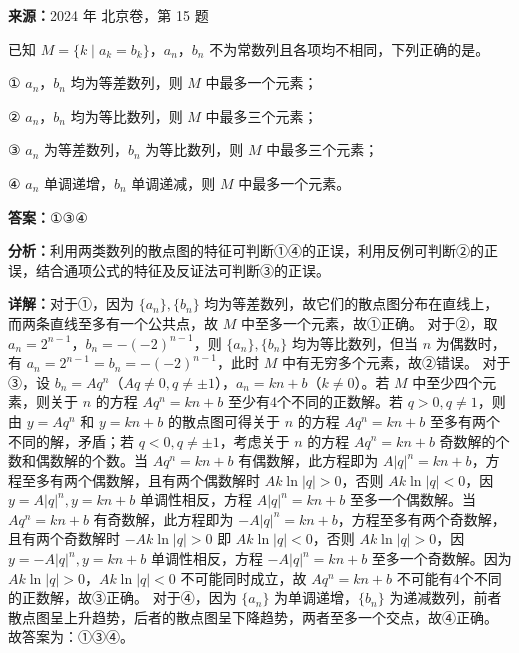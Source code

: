 \begin{question}[points=5]
\textbf{来源：}2024 年 北京卷，第 15 题\par
已知 $M = \{k \mid a_k = b_k\}$，$a_n$，$b_n$ 不为常数列且各项均不相同，下列正确的是。

① $a_n$，$b_n$ 均为等差数列，则 $M$ 中最多一个元素；

② $a_n$，$b_n$ 均为等比数列，则 $M$ 中最多三个元素；

③ $a_n$ 为等差数列，$b_n$ 为等比数列，则 $M$ 中最多三个元素；

④ $a_n$ 单调递增，$b_n$ 单调递减，则 $M$ 中最多一个元素。
\fillin[{$①③④$}]
\begin{solution}
\textbf{答案：}$①③④$

\textbf{分析：}利用两类数列的散点图的特征可判断①④的正误，利用反例可判断②的正误，结合通项公式的特征及反证法可判断③的正误。

\textbf{详解：}对于①，因为 $\{a_n\}, \{b_n\}$ 均为等差数列，故它们的散点图分布在直线上，而两条直线至多有一个公共点，故 $M$ 中至多一个元素，故①正确。
对于②，取 $a_n = 2^{n-1}$，$b_n = -(-2)^{n-1}$，则 $\{a_n\}, \{b_n\}$ 均为等比数列，但当 $n$ 为偶数时，有 $a_n = 2^{n-1} = b_n = -(-2)^{n-1}$，此时 $M$ 中有无穷多个元素，故②错误。
对于③，设 $b_n = Aq^n$（$Aq \neq 0, q \neq \pm 1$），$a_n = kn + b$（$k \neq 0$）。若 $M$ 中至少四个元素，则关于 $n$ 的方程 $Aq^n = kn + b$ 至少有4个不同的正数解。若 $q>0, q\neq 1$，则由 $y=Aq^n$ 和 $y=kn+b$ 的散点图可得关于 $n$ 的方程 $Aq^n = kn+b$ 至多有两个不同的解，矛盾；若 $q<0, q\neq \pm 1$，考虑关于 $n$ 的方程 $Aq^n = kn+b$ 奇数解的个数和偶数解的个数。当 $Aq^n = kn+b$ 有偶数解，此方程即为 $A|q|^n = kn+b$，方程至多有两个偶数解，且有两个偶数解时 $Ak\ln|q|>0$，否则 $Ak\ln|q|<0$，因 $y=A|q|^n, y=kn+b$ 单调性相反，方程 $A|q|^n = kn+b$ 至多一个偶数解。当 $Aq^n = kn+b$ 有奇数解，此方程即为 $-A|q|^n = kn+b$，方程至多有两个奇数解，且有两个奇数解时 $-Ak\ln|q|>0$ 即 $Ak\ln|q|<0$，否则 $Ak\ln|q|>0$，因 $y=-A|q|^n, y=kn+b$ 单调性相反，方程 $-A|q|^n = kn+b$ 至多一个奇数解。因为 $Ak\ln|q|>0$，$Ak\ln|q|<0$ 不可能同时成立，故 $Aq^n = kn+b$ 不可能有4个不同的正数解，故③正确。
对于④，因为 $\{a_n\}$ 为单调递增，$\{b_n\}$ 为递减数列，前者散点图呈上升趋势，后者的散点图呈下降趋势，两者至多一个交点，故④正确。
故答案为：①③④。
\end{solution}
\end{question}

